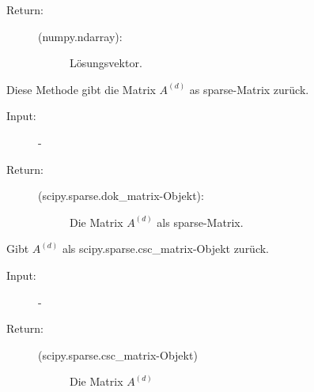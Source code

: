 \documentclass[letterpaper,10pt,ngerman, oneside, openright]{sphinxmanual}
\begin{document}
\begin{fulllineitems}
\begin{fulllineitems}
\begin{description}
\item[{Return:}] \leavevmode\begin{description}
\item[{(numpy.ndarray):}] \leavevmode
Lösungsvektor.

\end{description}

\end{description}

\end{fulllineitems}


\begin{fulllineitems}
\label{\detokenize{index:sparse_erw.Sparse.return_mat_d}}
Diese Methode gibt die Matrix $A^{(d)}$ as sparse-Matrix zurück.

\begin{description}
\item [{Input:}] -
\end{description}
\begin{description}
\item[{Return:}] \leavevmode\begin{description}
\item[{(scipy.sparse.dok\_matrix-Objekt):}] \leavevmode
Die Matrix $A^{(d)}$ als sparse-Matrix.

\end{description}

\end{description}

\end{fulllineitems}
\clearpage
{}

\begin{fulllineitems}
\label{\detokenize{index:sparse_erw.Sparse.return_mat_d_csc}}
Gibt $A^{(d)}$ als scipy.sparse.csc\_matrix-Objekt zurück.

\begin{description}
\item [{Input:}] -
\end{description}
\begin{description}
\item[{Return:}] \leavevmode\begin{description}
\item[{(scipy.sparse.csc\_matrix-Objekt)}] \leavevmode
Die Matrix $A^{(d)}$


\end{description}
\end{description}
\end{fulllineitems}
\end{fulllineitems}
\end{document}
